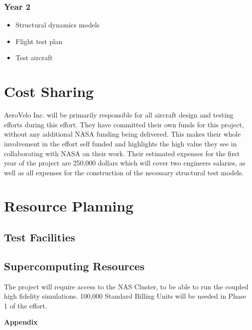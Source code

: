 \documentclass[]{aiaa-tc}
\begin{document}
        \subsubsection{Year 2}
            \begin{itemize}
                \item Structural dynamics models 
                \item Flight test plan
                \item Test aircraft
            \end{itemize}


  \section{Cost Sharing}
    AeroVelo Inc. will be primarily responsible for all aircraft design and testing efforts during this effort. 
    They have committed their own funds for this project, without any additional NASA funding being delivered.
    This makes their whole involvement in the effort self funded and highlights the high value they see 
    in collaborating with NASA on their work. Their estimated expenses for the first year of the project are 250,000 
    dollars which will cover two engineers salaries, as well as all expenses for the construction of the necessary 
    structural test models. 

  \section{Resource Planning}
    \subsection{Test Facilities}
    \subsection{Supercomputing Resources}
        The project will require access to the NAS Cluster, to be able to run the coupled high fidelity simulations. 
        100,000 Standard Billing Units will be needed in Phase 1 of the effort. 

  

  \appendix

  \clearpage
  \centerline{\huge{\textbf{Appendix}}}
\end{document}
